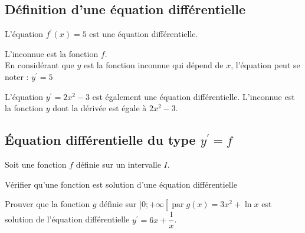 \subsection{Définition d'une équation différentielle}

\begin{bdefi}
	\pointilles[\textwidth-0.5cm]
	
	\pointilles[\textwidth-0.5cm]
\end{bdefi}	

\begin{bexemple}
	\begin{itemDef}
		\item L'équation $f^{\prime}(x)=5$ est une équation différentielle.
		
		L'inconnue est la fonction $f$.\\
		En considérant que $y$ est la fonction inconnue qui dépend de $x$, l'équation peut se noter : $y^{\prime}=5$
		\item L'équation $y^{\prime}=2 x^{2}-3$ est également une équation différentielle.
		L'inconnue est la fonction $y$ dont la dérivée est égale à $2 x^{2}-3$.
	\end{itemDef}	
\end{bexemple}

\subsection{Équation différentielle du type $y^{\prime}=f$}

\begin{bdefi}
	Soit une fonction $f$ définie sur un intervalle $I$.\\
	\pointilles[\textwidth-0.5cm]
	
	\pointilles[\textwidth-0.5cm]
\end{bdefi}

\begin{bprop}
	\pointilles[\textwidth-0.5cm]
	
	\pointilles[\textwidth-0.5cm]
	
	\pointilles[\textwidth-0.5cm]
\end{bprop}

\begin{bmethodet}{Vérifier qu'une fonction est solution d'une équation différentielle}
	
	Prouver que la fonction $g$ définie sur $] 0 ;+\infty\left[\operatorname{par} g(x)=3 x^{2}+\ln x\right.$ est solution de l'équation différentielle $y^{\prime}=6 x+\dfrac{1}{x}$.
\end{bmethodet}


